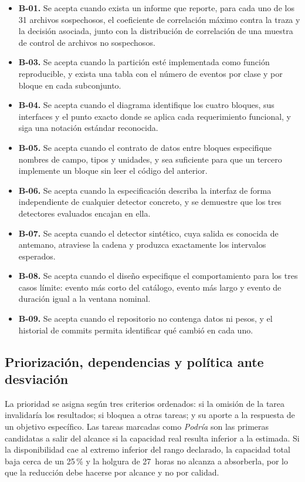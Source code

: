 \begin{itemize}
\item \textbf{B-01.} Se acepta cuando exista un informe que reporte, para cada uno
de los 31 archivos sospechosos, el coeficiente de correlación máximo contra la
traza y la decisión asociada, junto con la distribución de correlación de una
muestra de control de archivos no sospechosos.
\item \textbf{B-03.} Se acepta cuando la partición esté implementada como función
reproducible, y exista una tabla con el número de eventos por clase y por bloque
en cada subconjunto.
\item \textbf{B-04.} Se acepta cuando el diagrama identifique los cuatro bloques,
sus interfaces y el punto exacto donde se aplica cada requerimiento funcional, y
siga una notación estándar reconocida.
\item \textbf{B-05.} Se acepta cuando el contrato de datos entre bloques
especifique nombres de campo, tipos y unidades, y sea suficiente para que un
tercero implemente un bloque sin leer el código del anterior.
\item \textbf{B-06.} Se acepta cuando la especificación describa la interfaz de
forma independiente de cualquier detector concreto, y se demuestre que los tres
detectores evaluados encajan en ella.
\item \textbf{B-07.} Se acepta cuando el detector sintético, cuya salida es
conocida de antemano, atraviese la cadena y produzca exactamente los intervalos
esperados.
\item \textbf{B-08.} Se acepta cuando el diseño especifique el comportamiento para
los tres casos límite: evento más corto del catálogo, evento más largo y evento de
duración igual a la ventana nominal.
\item \textbf{B-09.} Se acepta cuando el repositorio no contenga datos ni pesos, y
el historial de commits permita identificar qué cambió en cada uno.
\end{itemize}

\subsection{Priorización, dependencias y política ante desviación}
\label{sec:anexo-priorizacion}

La prioridad se asigna según tres criterios ordenados: si la omisión de la tarea
invalidaría los resultados; si bloquea a otras tareas; y su aporte a la respuesta
de un objetivo específico. Las tareas marcadas como \emph{Podría} son las primeras
candidatas a salir del alcance si la capacidad real resulta inferior a la
estimada. Si la disponibilidad cae al extremo inferior del rango declarado, la
capacidad total baja cerca de un 25\,\% y la holgura de 27~horas no alcanza a
absorberla, por lo que la reducción debe hacerse por alcance y no por calidad.

